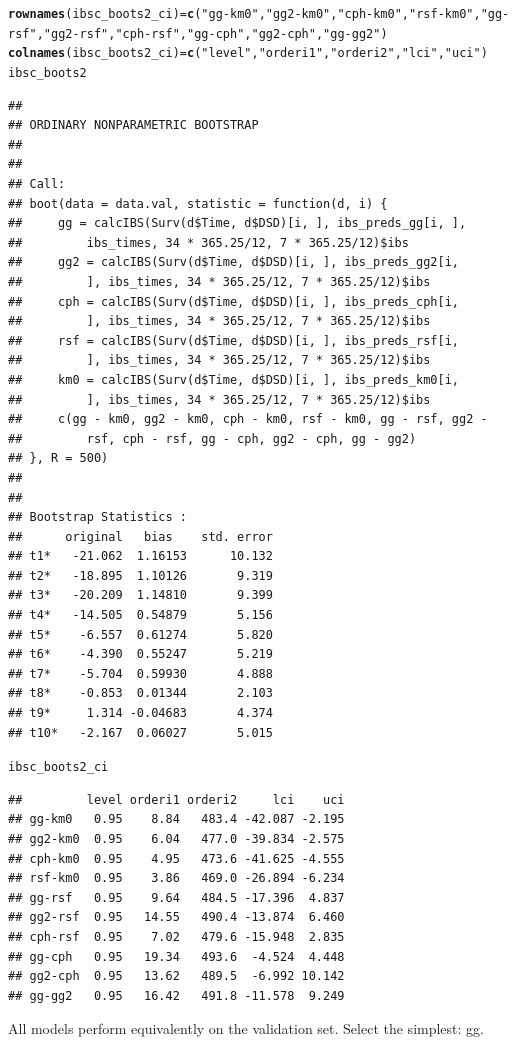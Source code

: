 \documentclass{article}\usepackage[]{graphicx}\usepackage[]{color}
\makeatletter
\newcommand{\hlstr}[1]{\textcolor[rgb]{0.192,0.494,0.8}{#1}}%
\newcommand{\hlstd}[1]{\textcolor[rgb]{0.345,0.345,0.345}{#1}}%
\newcommand{\hlkwb}[1]{\textcolor[rgb]{0.69,0.353,0.396}{#1}}%
\newcommand{\hlkwd}[1]{\textcolor[rgb]{0.737,0.353,0.396}{\textbf{#1}}}%
\newenvironment{kframe}{%
 \def\at@end@of@kframe{}%
 \ifinner\ifhmode%
  \def\at@end@of@kframe{\end{minipage}}%
  \begin{minipage}{\columnwidth}%
 \fi\fi%
 \def\FrameCommand##1{\hskip\@totalleftmargin \hskip-\fboxsep
 \colorbox{shadecolor}{##1}\hskip-\fboxsep
     \hskip-\linewidth \hskip-\@totalleftmargin \hskip\columnwidth}%
 \MakeFramed {\advance\hsize-\width
   \@totalleftmargin\z@ \linewidth\hsize
   \@setminipage}}%
 {\par\unskip\endMakeFramed%
 \at@end@of@kframe}
\newenvironment{knitrout}{}{} %
\makeatother
\begin{document}
\begin{knitrout}
\begin{kframe}
\begin{alltt}
\hlkwd{rownames}\hlstd{(ibsc_boots2_ci)} \hlkwb{=} \hlkwd{c}\hlstd{(}\hlstr{"gg-km0"}\hlstd{,} \hlstr{"gg2-km0"}\hlstd{,} \hlstr{"cph-km0"}\hlstd{,} \hlstr{"rsf-km0"}\hlstd{,} \hlstr{"gg-rsf"}\hlstd{,} \hlstr{"gg2-rsf"}\hlstd{,} \hlstr{"cph-rsf"}\hlstd{,} \hlstr{"gg-cph"}\hlstd{,} \hlstr{"gg2-cph"}\hlstd{,} \hlstr{"gg-gg2"}\hlstd{)}
\hlkwd{colnames}\hlstd{(ibsc_boots2_ci)} \hlkwb{=} \hlkwd{c}\hlstd{(}\hlstr{"level"}\hlstd{,} \hlstr{"orderi1"}\hlstd{,} \hlstr{"orderi2"}\hlstd{,} \hlstr{"lci"}\hlstd{,} \hlstr{"uci"}\hlstd{)}
\hlstd{ibsc_boots2}
\end{alltt}
\begin{verbatim}
## 
## ORDINARY NONPARAMETRIC BOOTSTRAP
## 
## 
## Call:
## boot(data = data.val, statistic = function(d, i) {
##     gg = calcIBS(Surv(d$Time, d$DSD)[i, ], ibs_preds_gg[i, ], 
##         ibs_times, 34 * 365.25/12, 7 * 365.25/12)$ibs
##     gg2 = calcIBS(Surv(d$Time, d$DSD)[i, ], ibs_preds_gg2[i, 
##         ], ibs_times, 34 * 365.25/12, 7 * 365.25/12)$ibs
##     cph = calcIBS(Surv(d$Time, d$DSD)[i, ], ibs_preds_cph[i, 
##         ], ibs_times, 34 * 365.25/12, 7 * 365.25/12)$ibs
##     rsf = calcIBS(Surv(d$Time, d$DSD)[i, ], ibs_preds_rsf[i, 
##         ], ibs_times, 34 * 365.25/12, 7 * 365.25/12)$ibs
##     km0 = calcIBS(Surv(d$Time, d$DSD)[i, ], ibs_preds_km0[i, 
##         ], ibs_times, 34 * 365.25/12, 7 * 365.25/12)$ibs
##     c(gg - km0, gg2 - km0, cph - km0, rsf - km0, gg - rsf, gg2 - 
##         rsf, cph - rsf, gg - cph, gg2 - cph, gg - gg2)
## }, R = 500)
## 
## 
## Bootstrap Statistics :
##      original   bias    std. error
## t1*   -21.062  1.16153      10.132
## t2*   -18.895  1.10126       9.319
## t3*   -20.209  1.14810       9.399
## t4*   -14.505  0.54879       5.156
## t5*    -6.557  0.61274       5.820
## t6*    -4.390  0.55247       5.219
## t7*    -5.704  0.59930       4.888
## t8*    -0.853  0.01344       2.103
## t9*     1.314 -0.04683       4.374
## t10*   -2.167  0.06027       5.015
\end{verbatim}
\begin{alltt}
\hlstd{ibsc_boots2_ci}
\end{alltt}
\begin{verbatim}
##         level orderi1 orderi2     lci    uci
## gg-km0   0.95    8.84   483.4 -42.087 -2.195
## gg2-km0  0.95    6.04   477.0 -39.834 -2.575
## cph-km0  0.95    4.95   473.6 -41.625 -4.555
## rsf-km0  0.95    3.86   469.0 -26.894 -6.234
## gg-rsf   0.95    9.64   484.5 -17.396  4.837
## gg2-rsf  0.95   14.55   490.4 -13.874  6.460
## cph-rsf  0.95    7.02   479.6 -15.948  2.835
## gg-cph   0.95   19.34   493.6  -4.524  4.448
## gg2-cph  0.95   13.62   489.5  -6.992 10.142
## gg-gg2   0.95   16.42   491.8 -11.578  9.249
\end{verbatim}
\end{kframe}
\end{knitrout}
All models perform equivalently on the validation set.  Select the simplest: gg.
\end{document}
